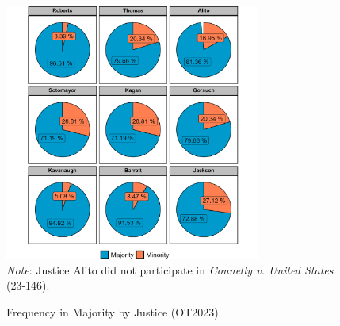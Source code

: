 \begin{landscape}
\begin{figure}[H]
\centering
\caption{Frequency in Majority by Justice (OT2023)}
\vspace{2.5mm}
\includegraphics[width = 0.75\textwidth]{Figures/statpack_figures/percent_majority_OT23.png} \\
\footnotesize{\emph{Note}: Justice Alito did not participate in \emph{Connelly v. United States} (23-146).}
\end{figure}
\end{landscape}

\newpage

